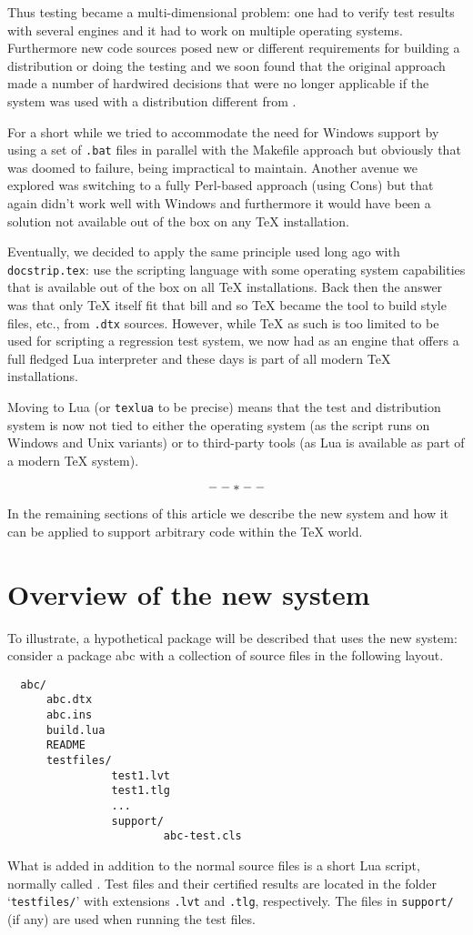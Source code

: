 \documentclass[final]{ltugboat}
\begin{document}
Thus testing became a multi-dimensional problem: one had to verify
test results with several engines and it had to work on multiple
operating systems. Furthermore new code sources posed new or different
requirements for building a distribution or doing the testing and
we soon found that the original approach made a number of hardwired
decisions that were no longer applicable if the system was used with a
distribution different from \LaTeXe{}.

For a short while we tried to accommodate the need for Windows support
by using a set of \texttt{.bat} files in parallel with the Makefile
approach but obviously that was doomed to failure, being impractical to
maintain. Another avenue we explored was switching to a fully
Perl-based approach (using Cons) but that again didn't work well with
Windows and furthermore it would have been a solution not available
out of the box on any \TeX{} installation.

Eventually, we decided to apply the same principle used
long ago with \texttt{docstrip.tex}: use the scripting language with
some operating system capabilities that is available out of the box on
all \TeX{} installations. Back then the answer was that only \TeX{} itself
fit that bill and so \TeX{} became the tool to build style files,
etc., from \texttt{.dtx} sources. However, while \TeX{} as such is too
limited to be used for scripting a regression test system, we now had
\luaTeX{} as an engine that offers a full fledged Lua interpreter\Dash
and these days \luaTeX{} is part of all modern \TeX{} installations.

Moving to Lua (or \texttt{texlua} to be precise) means that the test
and distribution system is now not tied to either the operating system
(as the script runs on Windows and Unix variants) or to third-party
tools (as Lua is available as part of a modern \TeX{} system).

\[
\centerline{$--*--$}
\]

\noindent In the remaining sections of this article we describe the new system
and how it can be applied to support arbitrary code within the \TeX{}
world.

\section{Overview of the new system}
\label{sec:overview}

To illustrate, a hypothetical package will be described that
uses the new system:
consider a package \textsf{abc} with a collection of source
files in the following layout.
\begin{Verbatim}
  abc/
      abc.dtx
      abc.ins
      build.lua
      README
      testfiles/
                test1.lvt
                test1.tlg
                ...
                support/
                        abc-test.cls
\end{Verbatim}
What is added in addition to the normal source files is a short Lua
script, normally called \texttt{\drivername}.  Test files and their
certified results are located in the folder `\texttt{testfiles/}'
with extensions \texttt{.lvt} and \texttt{.tlg}, respectively.  The files in
\texttt{support/} (if any) are used when running the test files.
\end{document}
